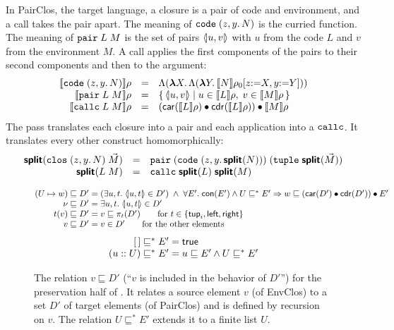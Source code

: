 In PairClos, the target language, a closure is
a pair of code and environment, and a call takes the pair apart. The
meaning of $\mathtt{code}\;(z, y.\,N)$ is the curried function. The
meaning of $\mathtt{pair}\;L\;M$ is the set of pairs $\langle\!|u,v|\!\rangle$ with
$u$ from the code $L$ and $v$ from the environment $M$. A call applies
the first components of the pairs to their second components and then
to the argument:
\[
\begin{array}{rcl}
    \llbracket \mathtt{code}\;(z, y.\,N) \rrbracket\rho & = & \Lambda(\boldsymbol{\lambda} X.\, \Lambda(\boldsymbol{\lambda} Y.\, \llbracket N \rrbracket\rho_0[z{:=}X, y{:=}Y]))\\
  \llbracket \mathtt{pair}\;L\;M \rrbracket\rho & = &
    \{\, \langle\!|u,v|\!\rangle \mid u \in \llbracket L \rrbracket\rho,\; v \in \llbracket M \rrbracket\rho \,\}\\
  \llbracket \mathtt{callc}\;L\;M \rrbracket\rho & = & (\mathsf{car}(\llbracket L \rrbracket\rho) \mathbin{\bullet} \mathsf{cdr}(\llbracket L \rrbracket\rho)) \mathbin{\bullet} \llbracket M \rrbracket\rho
\end{array}
\]
The  pass translates each closure into a pair and each
application into a $\mathtt{callc}$. It translates every other construct
homomorphically:
\[
\begin{array}{rcl}
    \textsf{\bfseries split}(\mathtt{clos}\;(z, y.\,N)\;\vec{M}) & = &
    \mathtt{pair}\;(\mathtt{code}\;(z, y.\,\textsf{\bfseries split}(N)))\;(\mathtt{tuple}\;\textsf{\bfseries split}(\vec{M}))\\
  \textsf{\bfseries split}(L\;M) & = &
    \mathtt{callc}\;\textsf{\bfseries split}(L)\;\textsf{\bfseries split}(M)
\end{array}
\]

\begin{figure}[t]
\small\figdefs
{}
\vspace{-10pt}
\[
\begin{array}{@{}r@{\;}c@{\;}l@{}}
  (U \mapsto w) \sqsubseteq D' & = &
    (\exists u, t.\; \pairv{u}{t} \in D') \;\land\;
    \forall E'.\; \mathsf{con}(E') \land U \sqsubseteq^* E'
      \Rightarrow w \sqsubseteq (\car(D') \app \cdr(D')) \app E'\\
  \nu \sqsubseteq D' & = & \exists u, t.\; \pairv{u}{t} \in D'\\
  t(v) \sqsubseteq D' & = & v \sqsubseteq \pi_t(D')
    \qquad \text{for } t \in \{\mathsf{tup}_i, \mathsf{left}, \mathsf{right}\}\\
  v \sqsubseteq D' & = & v \in D'
    \qquad \text{for the other elements}
\end{array}
\]
\vspace{-5pt}
\vspace{-10pt}
\[
\begin{array}{@{}r@{\;}c@{\;}l@{}}
  [\,] \sqsubseteq^* E' & = & \mathsf{true}\\
  (u :: U) \sqsubseteq^* E' & = & u \sqsubseteq E' \land U \sqsubseteq^* E'
\end{array}
\]
\caption{The relation $v \sqsubseteq D'$ (``$v$ is included in the
  behavior of $D'$'') for the preservation half of . It
  relates a source element $v$ (of EnvClos) to a set $D'$ of target
  elements (of PairClos) and is defined by recursion on $v$. The
  relation $U \sqsubseteq^* E'$ extends it to a finite list $U$.}
\label{fig:preserve}
\end{figure}

